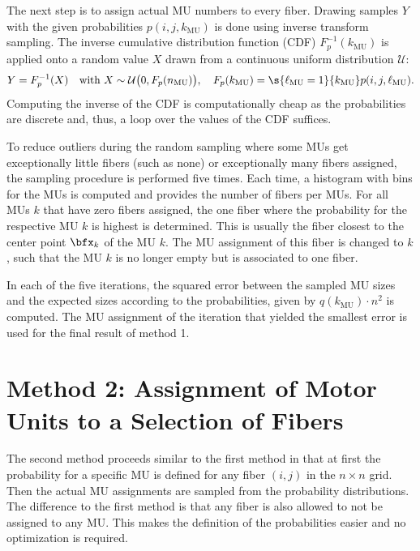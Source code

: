 The next step is to assign actual MU numbers to every fiber. Drawing samples $Y$ with the given probabilities $p(i,j,k_\text{MU})$ is done using inverse transform sampling. The inverse cumulative distribution function (CDF) $F_p^{-1}(k_\text{MU})$ is applied onto a random value $X$ drawn from a continuous uniform distribution $\mathcal{U}$:
\begin{align*}
  Y = F_p^{-1}(X)\quad \text{with }X\sim \mathcal{U}\big(0,F_p(n_\text{MU})\big), \quad F_p(k_\text{MU}) = \s{\ell_\text{MU}=1}{k_\text{MU}} p(i,j,\ell_\text{MU}).
\end{align*}
Computing the inverse of the CDF is computationally cheap as the probabilities are discrete and, thus, a loop over the values of the CDF suffices.

To reduce outliers during the random sampling where some MUs get exceptionally little fibers (such as none) or exceptionally many fibers assigned, the sampling procedure is performed five times.
Each time, a histogram with bins for the MUs is computed and provides the number of fibers per MUs. For all MUs $k$ that have zero fibers assigned, the one fiber where the probability for the respective MU $k$ is highest is determined. This is usually the fiber closest to the center point $\bfx_k$ of the MU $k$. The MU assignment of this fiber is changed to $k$, such that the MU $k$ is no longer empty but is associated to one fiber.

In each of the five iterations, the squared error between the sampled MU sizes and the expected sizes according to the probabilities, given by $q(k_\text{MU})\cdot n^2$ is computed. The MU assignment of the iteration that yielded the smallest error is used for the final result of method 1.


\section{Method 2: Assignment of Motor Units to a Selection of Fibers}\label{sec:method2_selection}

The second method proceeds similar to the first method in that at first the probability for a specific MU is defined for any fiber $(i,j)$ in the $n \times n$ grid. Then the actual MU assignments are sampled from the probability distributions. The difference to the first method is that any fiber is also allowed to not be assigned to any MU. This makes the definition of the probabilities easier and no optimization is required.

